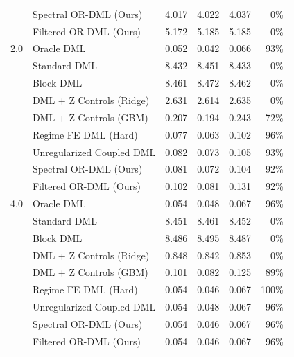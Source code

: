 \begin{tabular}{rlrrrr}
 & Spectral OR-DML (Ours) & 4.017 & 4.022 & 4.037 & 0\% \\
 & Filtered OR-DML (Ours) & 5.172 & 5.185 & 5.185 & 0\% \\
\midrule
2.0 & Oracle DML & 0.052 & 0.042 & 0.066 & 93\% \\
 & Standard DML & 8.432 & 8.451 & 8.433 & 0\% \\
 & Block DML & 8.461 & 8.472 & 8.462 & 0\% \\
 & DML + Z Controls (Ridge) & 2.631 & 2.614 & 2.635 & 0\% \\
 & DML + Z Controls (GBM) & 0.207 & 0.194 & 0.243 & 72\% \\
 & Regime FE DML (Hard) & 0.077 & 0.063 & 0.102 & 96\% \\
 & Unregularized Coupled DML & 0.082 & 0.073 & 0.105 & 93\% \\
 & Spectral OR-DML (Ours) & 0.081 & 0.072 & 0.104 & 92\% \\
 & Filtered OR-DML (Ours) & 0.102 & 0.081 & 0.131 & 92\% \\
\midrule
4.0 & Oracle DML & 0.054 & 0.048 & 0.067 & 96\% \\
 & Standard DML & 8.451 & 8.461 & 8.452 & 0\% \\
 & Block DML & 8.486 & 8.495 & 8.487 & 0\% \\
 & DML + Z Controls (Ridge) & 0.848 & 0.842 & 0.853 & 0\% \\
 & DML + Z Controls (GBM) & 0.101 & 0.082 & 0.125 & 89\% \\
 & Regime FE DML (Hard) & 0.054 & 0.046 & 0.067 & 100\% \\
 & Unregularized Coupled DML & 0.054 & 0.048 & 0.067 & 96\% \\
 & Spectral OR-DML (Ours) & 0.054 & 0.046 & 0.067 & 96\% \\
 & Filtered OR-DML (Ours) & 0.054 & 0.046 & 0.067 & 96\% \\
\bottomrule
\end{tabular}